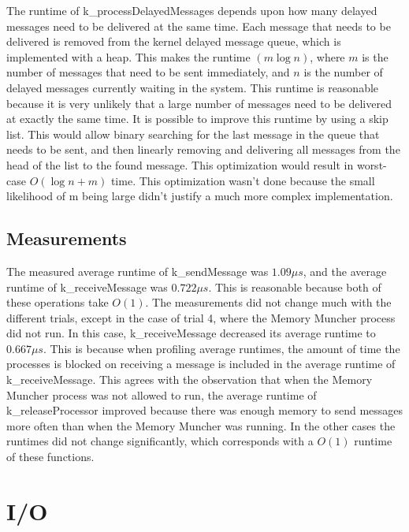\documentclass[12pt]{report}
\begin{document}
    The runtime of k\_processDelayedMessages depends upon how many delayed
    messages  need to be delivered at the same time. Each message that needs to
    be delivered  is removed from the kernel delayed message queue, which is
    implemented  with a heap. This makes  the runtime $(m \log n)$, where $m$ is
    the number of messages that need to be sent immediately, and $n$ is the
    number of delayed messages currently waiting in the system. This runtime is
    reasonable because it is very unlikely that a large number of messages need
    to be delivered at exactly the same time. It is possible to improve this
    runtime by using a skip list. This would allow binary searching for the last
    message in the queue that needs to be sent, and then linearly removing and
    delivering all messages  from the head of the list to the found message.
    This optimization would result  in worst-case $O(\log n + m)$ time. This
    optimization wasn't done because the  small likelihood of m being large
    didn't justify a much more complex implementation.

\section{Measurements}
    
    The measured average runtime of k\_sendMessage was $1.09 \mu s$, and the average 
    runtime of k\_receiveMessage was $0.722 \mu s$. This is reasonable because both 
    of these operations take $O(1)$. The measurements did not change much with the 
    different trials, except in the case of trial 4, where the Memory Muncher process 
    did not run. In this case, k\_receiveMessage decreased its average runtime to 
    $0.667 \mu s$. This is because when profiling average runtimes, the amount of 
    time the processes is blocked on receiving a message is included in the average runtime 
    of k\_receiveMessage. This agrees with the observation that when the Memory Muncher 
    process was not allowed to run, the average runtime of k\_releaseProcessor improved 
    because there was enough memory to send messages more often than when the Memory 
    Muncher was running. In the other cases the runtimes did not change significantly, 
    which corresponds with a $O(1)$ runtime of these functions.

\chapter{I/O}
\end{document}
